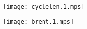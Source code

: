 \documentclass[letterpaper,10pt]{article}
\begin{document}
\begin{figure}
\centering
\texttt{[image: cyclelen.1.mps]}
\end{figure}

\begin{figure}
\centering
\texttt{[image: brent.1.mps]}
\end{figure}
\end{document}
